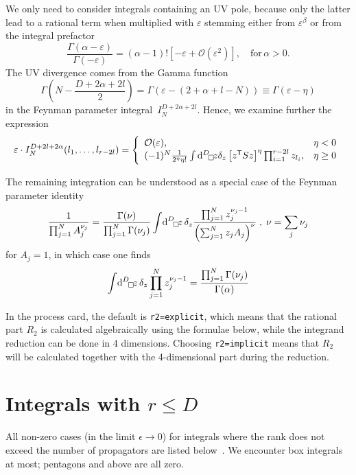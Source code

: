 We only need to consider integrals containing an UV pole, because only the latter lead to
a rational term when multiplied with $\varepsilon$ stemming either from
$\varepsilon^\beta$ or from the integral prefactor
\begin{equation}
\frac{\Gamma(\alpha-\varepsilon)}{\Gamma(-\varepsilon)}=
(\alpha-1)!\left[-\varepsilon +{\mathcal O}(\varepsilon^2)\right],
\quad\text{for}\,\alpha>0.
\end{equation}
The UV divergence comes from the Gamma function
\begin{equation}
\Gamma\left(N-\frac{D+2\alpha+2l}2\right)=
\Gamma(\varepsilon-(2+\alpha+l-N))\equiv\Gamma(\varepsilon-\eta)
\end{equation}
in the Feynman parameter integral~$I_N^{D+2\alpha+2l}$.
Hence, we examine further the expression
\begin{equation}
\varepsilon\cdot I_N^{D+2l+2\alpha}(l_1,\ldots, l_{r-2l})=
\left\{\begin{array}{lr}
{\mathcal O}(\varepsilon),&\eta<0\\
(-1)^N\frac1{2^\eta\eta!}\int\diff[D]_\Box\!z\delta_z
\left[z^{\mathsf{T}}Sz\right]^\eta
\prod_{i=1}^{r-2l}z_{l_i},&\eta\geq0
\end{array}\right.
\end{equation}

The remaining integration can be understood as a special case of the
Feynman parameter identity
\begin{equation}
\frac{1}{\prod_{j=1}^N A_j^{\nu_j}}=\frac{\Gamma(\nu)}{
\prod_{j=1}^N \Gamma(\nu_j)}\int\!\diff[D]_\Box\!z\,\delta_z
\frac{\prod_{j=1}^N z_j^{\nu_j-1}}{\left(
\sum_{j=1}^N z_j A_j\right)^\nu}\; , \; \nu=\sum_j \nu_j
\end{equation}
for $A_j=1$, in which case one finds
\begin{equation}
\int\!\diff[D]_\Box\!z\,\delta_z
\prod_{j=1}^N z_j^{\nu_j-1}=\frac{\prod_{j=1}^N \Gamma(\nu_j)}%
{\Gamma(\alpha)}
\end{equation}

In the \gosam{} process card, the default is \texttt{r2=explicit}, which means that
the rational part $R_2$ is calculated algebraically using the formulae below,
while the integrand reduction can be done in 4 dimensions.
Choosing \texttt{r2=implicit} means that $R_2$ will be calculated together with the 4-dimensional
part during the reduction.

\section*{Integrals with \boldmath$r\leq D$}
All non-zero cases (in the limit $\epsilon\to0$) for
integrals where the rank does not exceed the number of propagators are listed
 below~\cite{Binoth:2006hk,Reiter:2009kb}. We encounter box integrals at most; pentagons and above are all zero.

